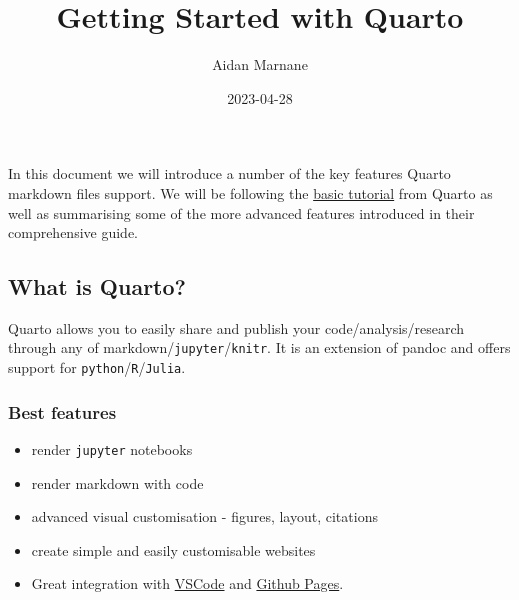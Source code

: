 \documentclass[
  letterpaper,
  DIV=11,
  numbers=noendperiod,
  oneside]{scrartcl}
\title{Getting Started with Quarto}
\author{Aidan Marnane}
\date{2023-04-28}
\providecommand{\tightlist}{%
  \setlength{\itemsep}{0pt}\setlength{\parskip}{0pt}}\usepackage{longtable,booktabs,array}
\renewcommand*\contentsname{Table of contents}
\newcommand\contentsname{Table of contents}
\begin{document}
\maketitle
\ifdefined\Shaded\renewenvironment{Shaded}{\begin{tcolorbox}[interior hidden, sharp corners, borderline west={3pt}{0pt}{shadecolor}, frame hidden, breakable, enhanced, boxrule=0pt]}{\end{tcolorbox}}\fi

\renewcommand*\contentsname{Table of contents}
{
\hypersetup{linkcolor=}
\setcounter{tocdepth}{3}
\tableofcontents
}
In this document we will introduce a number of the key features Quarto
markdown files support. We will be following the
\href{https://quarto.org/docs/get-started/computations/vscode.html}{basic
tutorial} from Quarto as well as summarising some of the more advanced
features introduced in their comprehensive guide. 

\hypertarget{what-is-quarto}{%
\subsection{What is Quarto?}\label{what-is-quarto}}

Quarto allows you to easily share and publish your
code/analysis/research through any of
markdown/\texttt{jupyter}/\texttt{knitr}. It is an extension of pandoc
and offers support for \texttt{python}/\texttt{R}/\texttt{Julia}.

\hypertarget{best-features}{%
\subsubsection{Best features}\label{best-features}}

\begin{itemize}
\tightlist
\item
  render \texttt{jupyter} notebooks
\item
  render markdown with code
\item
  advanced visual customisation - figures, layout, citations
\item
  create simple and easily customisable websites
\item
  Great integration with \href{https://code.visualstudio.com/}{VSCode}
  and \href{https://pages.github.com/}{Github Pages}.
\end{itemize}
\end{document}
